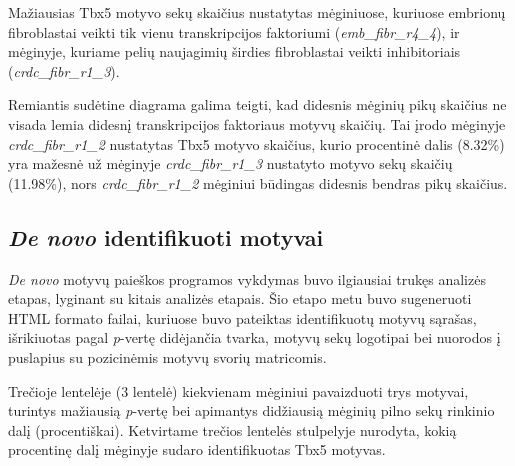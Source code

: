 \documentclass[12pt]{article}
\begin{document}
Mažiausias Tbx5 motyvo sekų skaičius nustatytas mėginiuose, kuriuose embrionų
fibroblastai veikti tik vienu transkripcijos faktoriumi
(\small\emph{emb\_fibr\_r4\_4}), ir mėginyje, kuriame pelių naujagimių
širdies fibroblastai veikti inhibitoriais
(\small\emph{crdc\_fibr\_r1\_3}).

Remiantis sudėtine diagrama galima teigti, kad didesnis mėginių pikų skaičius
ne visada lemia didesnį transkripcijos faktoriaus motyvų skaičių. Tai įrodo
mėginyje \small\emph{crdc\_fibr\_r1\_2} nustatytas Tbx5 motyvo skaičius,
kurio procentinė dalis (8.32\%) yra mažesnė už mėginyje
\small\emph{crdc\_fibr\_r1\_3} nustatyto motyvo sekų skaičių (11.98\%),
nors \small\emph{crdc\_fibr\_r1\_2} mėginiui būdingas didesnis bendras pikų
skaičius.

\newpage

\subsection{\emph{De novo} identifikuoti motyvai}
\emph{De novo} motyvų paieškos programos vykdymas buvo ilgiausiai trukęs
analizės etapas, lyginant su kitais analizės etapais. Šio etapo metu buvo
sugeneruoti HTML formato failai, kuriuose buvo pateiktas identifikuotų motyvų
sąrašas, išrikiuotas pagal \emph{p}-vertę didėjančia tvarka, motyvų sekų
logotipai bei nuorodos į puslapius su pozicinėmis motyvų svorių matricomis.

Trečioje lentelėje (3 lentelė) kiekvienam mėginiui pavaizduoti trys motyvai,
turintys mažiausią \emph{p}-vertę bei apimantys didžiausią mėginių pilno sekų
rinkinio dalį (procentiškai). Ketvirtame trečios lentelės stulpelyje nurodyta,
kokią procentinę dalį mėginyje sudaro identifikuotas Tbx5 motyvas.
\end{document}
